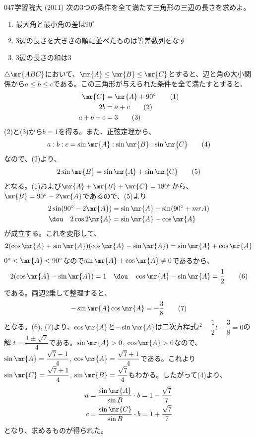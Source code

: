 \begin{prob}{047}{}{学習院大 (2011)}
 次の3つの条件を全て満たす三角形の三辺の長さを求めよ。
 \begin{enumerate}
  \renewcommand{\labelenumi}{(\alph{enumi})}
  \item 最大角と最小角の差は$90^\circ$
  \item 3辺の長さを大きさの順に並べたものは等差数列をなす
  \item 3辺の長さの和は3
 \end{enumerate}
\end{prob}
$\triangle\mr{ABC}$において、$\mr{A}\le\mr{B}\le\mr{C}$とすると、辺と角の大小関係から$a\le b\le c$である。この三角形が与えられた条件を全て満たすとすると、
\begin{align*}
 \mr{C}&=\mr{A}+90^\circ \tag{1} \\
 2b&=a+c \tag{2} \\
 a+b+c&=3 \tag{3}
\end{align*}
(2)と(3)から$b=1$を得る。また、正弦定理から、
\[ a:b:c=\sin\mr{A}:\sin\mr{B}:\sin\mr{C} \tag{4} \]
なので、(2)より、
\[ 2\sin\mr{B}=\sin\mr{A}+\sin\mr{C} \tag{5} \]
となる。(1)および$\mr{A}+\mr{B}+\mr{C}=180^\circ$から、$\mr{B}=90^\circ-2\mr{A}$であるので、(5)より
\begin{align*}
 2\sin(90^\circ-2\mr{A})&= \sin\mr{A}+\sin(90^\circ+mr{A}) \\
 \dou\quad 2\cos 2\mr{A} &= \sin\mr{A}+\cos\mr{A}
\end{align*}
が成立する。これを変形して、
\[ 2(\cos\mr{A}+\sin\mr{A})(\cos\mr{A}-\sin\mr{A})=\sin\mr{A}+\cos\mr{A} \]
$0^\circ < \mr{A}<90^\circ$なので$\sin\mr{A}+\cos\mr{A}\neq 0$であるから、
\[ 2(\cos\mr{A}-\sin\mr{A})=1 \quad\dou\quad \cos\mr{A}-\sin\mr{A}=\frac{1}{2} \tag{6} \]
である。両辺2乗して整理すると、
\[-\sin\mr{A}\cos\mr{A}=-\frac{3}{8} \tag{7} \]
となる。(6), (7)より、$\cos\mr{A}$と$-\sin\mr{A}$は二次方程式$t^2-\dfrac{1}{2}t-\dfrac{3}{8}=0$の解 $t=\dfrac{1\pm\sqrt{7}}{4}$である。$\sin\mr{A}>0$, $\cos\mr{A}>0$なので、$\sin\mr{A}=\dfrac{\sqrt{7}-1}{4}$, $\cos\mr{A}=\dfrac{\sqrt{7}+1}{4}$である。これより$\sin\mr{C}=\dfrac{\sqrt{7}+1}{4}$, $\sin\mr{B}=\dfrac{\sqrt{7}}{4}$もわかる。したがって(4)より、
\begin{align*}
 a&=\frac{\sin\mr{A}}{\sin{B}}\cdot b=1-\frac{\sqrt{7}}{7} \\
 c&=\frac{\sin\mr{C}}{\sin{B}}\cdot b=1+\frac{\sqrt{7}}{7} \\
\end{align*}
となり、求めるものが得られた。
